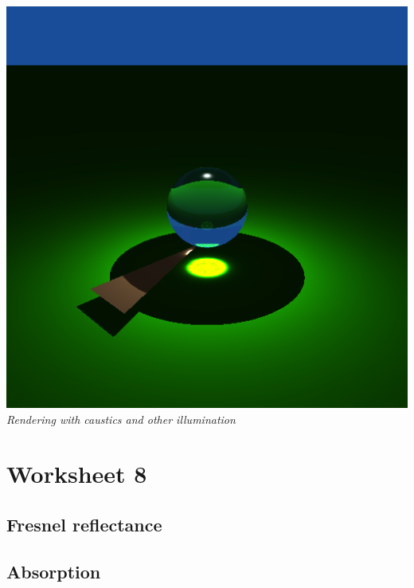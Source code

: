 \documentclass[a4,12pt]{article}
\begin{document}
\begin{center}
\begin{minipage}[b]{0.40\linewidth}
\begin{center}
				\includegraphics[width = \textwidth]{./Worksheet6/causticsandillumination.png}\\
				\textit{Rendering with caustics and other illumination}
			\end{center}
		\end{minipage}
	\end{center}
	
	\section{Worksheet 8}
	\subsection{Fresnel reflectance}
	
	\subsection{Absorption}
	
\end{document}
